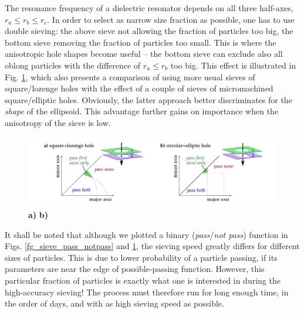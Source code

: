 The resonance frequency of a dielectric resonator depends on all three half-axes, $r_a \leq r_b \leq r_c$. In order to select as narrow size fraction as possible, one has to use double sieving: the above sieve not allowing the fraction of particles too big, the bottom sieve removing the fraction of particles too small. This is where the anisotropic hole shapes become useful -- the bottom sieve can exclude also all oblong particles with the difference of $r_a \leq r_b$ too big. This effect is illustrated in Fig. \ref{fg_double_sieving}, which also presents a comparison of using more usual sieves of square/lozenge holes with the effect of a couple of sieves of micromachined square/elliptic holes. Obviously, the latter approach better discriminates for the \textit{shape} of the ellipsoid. This advantage further gains on importance when the anisotropy of the sieve is low.
\begin{figure}[ht] \caption{\textbf{a)} \textbf{b)} } \label{fg_double_sieving} \centering 
\includegraphics[width=\textwidth]{img/technology/sieve_double_sieving_fractions.pdf}
\end{figure}

It shall be noted that although we plotted a binary (\textit{pass}/\textit{not pass}) function in Figs. \ref{fg_sieve_pass_notpass} and \ref{fg_double_sieving}, the sieving speed greatly differs for different sizes of particles. This is due to lower probability of a particle passing, if its parameters are near the edge of possible-passing function. 
However, this particular fraction of particles is exactly what one is interested in during the high-accuracy sieving! The process must therefore run for long enough time, in the order of days, and with as high sieving speed as possible.

